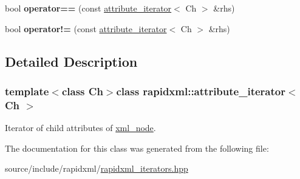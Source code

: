 \begin{DoxyCompactItemize}
\item 
\hypertarget{classrapidxml_1_1attribute__iterator_ab1dc8dd11d21e145a4e3f76d46aead0d}{}bool {\bfseries operator==} (const \hyperlink{classrapidxml_1_1attribute__iterator}{attribute\+\_\+iterator}$<$ Ch $>$ \&rhs)\label{classrapidxml_1_1attribute__iterator_ab1dc8dd11d21e145a4e3f76d46aead0d}

\item 
\hypertarget{classrapidxml_1_1attribute__iterator_a39e8cf336c324521fd9c720abf280d88}{}bool {\bfseries operator!=} (const \hyperlink{classrapidxml_1_1attribute__iterator}{attribute\+\_\+iterator}$<$ Ch $>$ \&rhs)\label{classrapidxml_1_1attribute__iterator_a39e8cf336c324521fd9c720abf280d88}

\end{DoxyCompactItemize}


\subsection{Detailed Description}
\subsubsection*{template$<$class Ch$>$class rapidxml\+::attribute\+\_\+iterator$<$ Ch $>$}

Iterator of child attributes of \hyperlink{classrapidxml_1_1xml__node}{xml\+\_\+node}. 

The documentation for this class was generated from the following file\+:\begin{DoxyCompactItemize}
\item 
source/include/rapidxml/\hyperlink{rapidxml__iterators_8hpp}{rapidxml\+\_\+iterators.\+hpp}\end{DoxyCompactItemize}
